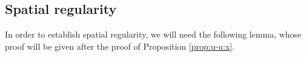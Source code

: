 \documentclass[reqno]{amsart}
\renewcommand{\d}{\mathrm d}
\newcommand{\e}{\mathrm e}
\newcommand{\1}{\mathbf 1}
\numberwithin{equation}{section}
\theoremstyle{definition}
\begin{document}

\subsection{Spatial regularity}

In order to establish spatial regularity, we will 
need the following lemma, whose proof will be given after the proof of Proposition \ref{prop:u-u:x}.
\end{document}
